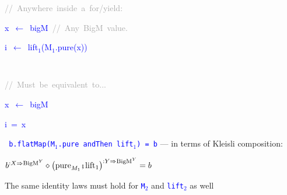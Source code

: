 {\footnotesize{}\vspace{-0.3cm}\hspace{-0.0cm}}\texttt{\textcolor{blue}{\footnotesize{}}}%
\begin{minipage}[t]{0.54\columnwidth}%
\begin{lyxcode}
\textrm{\textcolor{darkgray}{\footnotesize{}//~Anywhere~inside~a~for/yield:}}{\footnotesize\par}

\textcolor{blue}{\footnotesize{}x~$\leftarrow$~bigM~}\textrm{\textcolor{darkgray}{\footnotesize{}//~Any~BigM~value.}}{\footnotesize\par}

\textcolor{blue}{\footnotesize{}i~$\leftarrow$~lift$_{1}$(M$_{1}$.pure(x))}{\footnotesize\par}
\end{lyxcode}
%
\end{minipage}\texttt{\textcolor{blue}{\footnotesize{}~ }}%
\begin{minipage}[t]{0.54\columnwidth}%
\begin{lyxcode}
\textrm{\textcolor{darkgray}{\footnotesize{}//~Must~be~equivalent~to...}}{\footnotesize\par}

\textcolor{blue}{\footnotesize{}x~$\leftarrow$~bigM}{\footnotesize\par}

\textcolor{blue}{\footnotesize{}i~=~x}{\footnotesize\par}
\end{lyxcode}
%
\end{minipage}\texttt{\textcolor{blue}{\footnotesize{}\medskip{}
b.flatMap(M$_{1}$.pure andThen lift$_{1}$) = b}} — in terms of Kleisli
composition:
\begin{center}
{\footnotesize{}\vspace{-0.1cm}\hspace{-0.0cm}$b^{:X\Rightarrow\text{BigM}^{Y}}\diamond\left(\text{pure}_{M_{1}}\bef\text{lift}_{1}\right)^{:Y\Rightarrow\text{BigM}^{Y}}=b$}{\footnotesize\par}
\par\end{center}

{\footnotesize{}\vspace{-0.15cm}\hspace{-0.0cm}}The same identity
laws must hold for \texttt{\textcolor{blue}{\footnotesize{}M$_{2}$}}
and \texttt{\textcolor{blue}{\footnotesize{}lift$_{2}$}} as well


